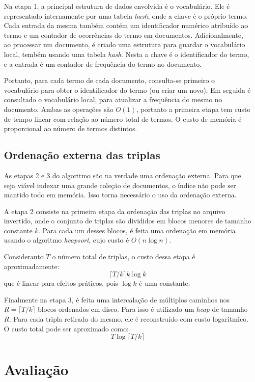 \documentclass[12pt]{article}
\begin{document}
Na etapa 1, a principal estrutura de dados envolvida é o vocabulário. Ele é representado internamente por uma tabela \emph{hash}, onde a chave é o próprio termo. Cada entrada da mesma também contém um identificador numérico atribuído ao termo e um contador de ocorrências do termo em documentos. Adicionalmente, ao processar um documento, é criado uma estrutura para guardar o vocabulário local, tembém usando uma tabela \emph{hash}. Nesta a chave é o identificador do termo, e a entrada é um contador de frequência do termo no documento.

Portanto, para cada termo de cada documento, consulta-se primeiro o vocabulário para obter o identificador do termo (ou criar um novo). Em seguida é consultado o vocabulário local, para atualizar a frequência do mesmo no documento. Ambas as operações são $O(1)$, portanto a primeira etapa tem custo de tempo linear com relação ao número total de termos. O custo de memória é proporcional ao número de termos distintos.


\subsection{Ordenação externa das triplas}

As etapas 2 e 3 do algoritmo são na verdade uma ordenação externa. Para que seja viável indexar uma grande coleção de documentos, o índice não pode ser mantido todo em memória. Isso torna necessário o uso da ordenação externa.

A etapa 2 consiste na primeira etapa da ordenação das triplas no arquivo invertido, onde o conjunto de triplas são divididos em blocos menores de tamanho constante $k$. Para cada um desses blocos, é feita uma ordenação em memória usando o algoritmo \emph{heapsort}, cujo custo é $O(n \log{n})$.

Consideranto $T$ o número total de triplas, o custo dessa etapa é aproximadamente: 
$$\lceil T/k \rceil k \log{k}$$
que é linear para efeitos práticos, pois $\log{k}$ é uma constante.

Finalmente na etapa 3, é feita uma intercalação de múltiplos caminhos nos $R = \lceil T/k \rceil$ blocos ordenados em disco. Para isso é utilizado um \emph{heap} de tamanho $R$. Para cada tripla retirada do mesmo, ele é reconstruído com custo logaritmico. O custo total pode ser aproximado como:
$$T \log{\lceil T/k \rceil}$$



\section{Avaliação}
\end{document}
